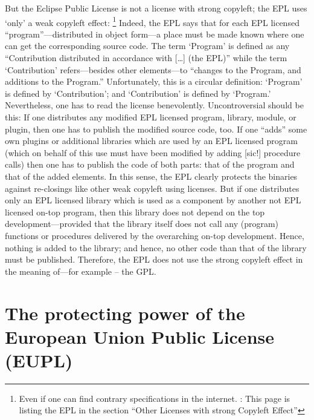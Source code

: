 But the Eclipse Public License is not a license with strong copyleft; the EPL
uses `only' a weak copyleft effect:%
  \footnote{Even if one can find contrary specifications in the
  internet. \cite[Pars pro toto cf.][\nopage wp]{ifross2011a}: This page is
  listing the EPL in the section \enquote{Other Licenses with strong Copyleft
  Effect}}
Indeed, the EPL says that for each EPL
licensed \enquote{program}---distributed in object form---a place must be made
known where one can get the corresponding source code.
The term `Program' is defined as any \enquote{Contribution distributed in
accordance with [\ldots] (the EPL)} while the term `Contribution'
refers---besides other elements---to \enquote{changes to the Program, and
additions to the Program.} Unfortunately, this is a circular definition:
`Program' is defined by `Contribution'; and `Contribution' is defined by
`Program.' Nevertheless, one has to read the license benevolently.
Uncontroversial should be this: If one distributes any modified EPL licensed
program, library, module, or plugin, then one has to publish the modified source
code, too. If one \enquote{adds} some own plugins or additional libraries which
are used by an EPL licensed program (which on behalf of this use must have been
modified by adding [sic!] procedure calls) then one has to publish the code of
both parts: that of the program and that of the added elements. In this sense,
the EPL clearly protects the binaries against re-closings like other weak
copyleft using licenses. But if one distributes only an EPL licensed library
which is used as a component by another not EPL licensed on-top program, then
this library does not depend on the top development---provided that the library
itself does not call any (program) functions or procedures delivered by the
overarching on-top development. Hence, nothing is added to the library; and
hence, no other code than that of the library must be published. Therefore, the
EPL does not use the strong copyleft effect in the meaning of---for example --
the GPL.
 
\section{\texorpdfstring{The protecting power of the}{The} European Union Public License (EUPL)}

